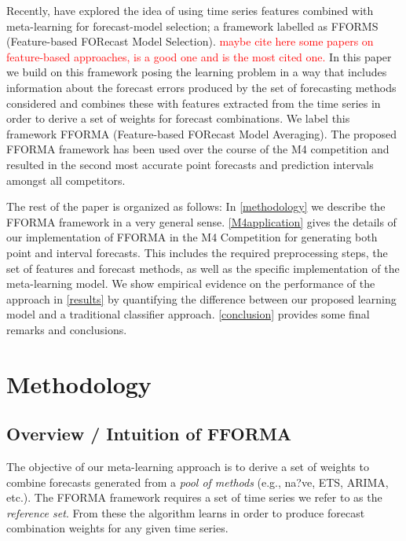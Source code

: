 \documentclass[11pt,a4paper,]{article}
\theoremstyle{definition}
\theoremstyle{definition}
\theoremstyle{definition}
\theoremstyle{remark}
\begin{document}
Recently, \textcite{fforms} have explored the idea of using time series
features combined with meta-learning for forecast-model selection; a
framework labelled as FFORMS (Feature-based FORecast Model Selection).
\textcolor{red}{ maybe cite here some papers on feature-based approaches, }\textcite{prudencio2004using}
\textcolor{red}{is a good one and } \textcite{LEMKE20102006}
\textcolor{red}{is the most cited one.} In this paper we build on this
framework posing the learning problem in a way that includes information
about the forecast errors produced by the set of forecasting methods
considered and combines these with features extracted from the time
series in order to derive a set of weights for forecast combinations. We
label this framework FFORMA (Feature-based FORecast Model Averaging).
The proposed FFORMA framework has been used over the course of the M4
competition and resulted in the second most accurate point forecasts and
prediction intervals amongst all competitors.

The rest of the paper is organized as follows: In \autoref{methodology}
we describe the FFORMA framework in a very general sense.
\autoref{M4application} gives the details of our implementation of
FFORMA in the M4 Competition for generating both point and interval
forecasts. This includes the required preprocessing steps, the set of
features and forecast methods, as well as the specific implementation of
the meta-learning model. We show empirical evidence on the performance
of the approach in \autoref{results} by quantifying the difference
between our proposed learning model and a traditional classifier
approach. \autoref{conclusion} provides some final remarks and
conclusions.

\section{Methodology}\label{methodology}

\subsection{Overview / Intuition of
FFORMA}\label{overview-intuition-of-fforma}

The objective of our meta-learning approach is to derive a set of
weights to combine forecasts generated from a \emph{pool of methods}
(e.g., na?ve, ETS, ARIMA, etc.). The FFORMA framework requires a set of
time series we refer to as the \emph{reference set}. From these the
algorithm learns in order to produce forecast combination weights for
any given time series.
\end{document}
